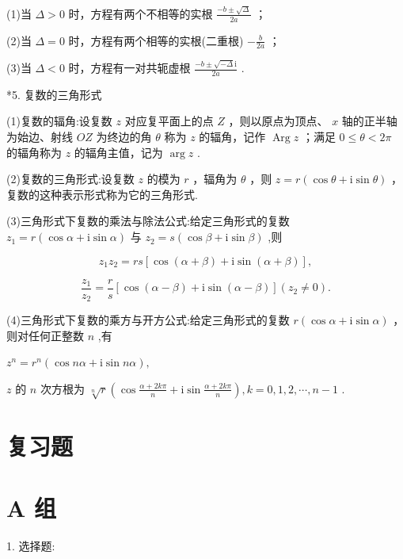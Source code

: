 \documentclass[10pt]{article}
\begin{document}
(1)当 \(\Delta  > 0\) 时，方程有两个不相等的实根 \(\frac{-b \pm  \sqrt{\Delta }}{2a}\) ；

(2)当 \(\Delta  = 0\) 时，方程有两个相等的实根(二重根) \(- \frac{b}{2a}\) ；

(3)当 \(\Delta  < 0\) 时，方程有一对共轭虚根 \(\frac{-b \pm  \sqrt{-\Delta }\mathrm{i}}{2a}\) .

*5. 复数的三角形式

(1)复数的辐角:设复数 \(z\) 对应复平面上的点 \(Z\) ，则以原点为顶点、 \(x\) 轴的正半轴为始边、射线 \({OZ}\) 为终边的角 \(\theta\) 称为 \(z\) 的辐角，记作 \(\operatorname{Arg}z\) ；满足 \(0 \leq  \theta  < {2\pi }\) 的辐角称为 \(z\) 的辐角主值，记为 \(\arg z\) .

(2)复数的三角形式:设复数 \(z\) 的模为 \(r\) ，辐角为 \(\theta\) ，则 \(z = r\left( {\cos \theta  + \mathrm{i}\sin \theta }\right)\) ，复数的这种表示形式称为它的三角形式.

(3)三角形式下复数的乘法与除法公式:给定三角形式的复数 \({z}_{1} = r\left( {\cos \alpha  + \mathrm{i}\sin \alpha }\right)\) 与 \({z}_{2} = s\left( {\cos \beta  + \mathrm{i}\sin \beta }\right)\) ,则

\[
{z}_{1}{z}_{2} = {rs}\left\lbrack  {\cos \left( {\alpha  + \beta }\right)  + \mathrm{i}\sin \left( {\alpha  + \beta }\right) }\right\rbrack  ,
\]

\[
\frac{{z}_{1}}{{z}_{2}} = \frac{r}{s}\left\lbrack  {\cos \left( {\alpha  - \beta }\right)  + \mathrm{i}\sin \left( {\alpha  - \beta }\right) }\right\rbrack  \left( {{z}_{2} \neq  0}\right) .
\]

(4)三角形式下复数的乘方与开方公式:给定三角形式的复数 \(r\left( {\cos \alpha  + \mathrm{i}\sin \alpha }\right)\) ，则对任何正整数 \(n\) ,有

\({z}^{n} = {r}^{n}\left( {\cos {n\alpha } + \mathrm{i}\sin {n\alpha }}\right) ,\)

\(z\) 的 \(n\) 次方根为 \(\sqrt[n]{r}\left( {\cos \frac{\alpha  + {2k\pi }}{n} + \mathrm{i}\sin \frac{\alpha  + {2k\pi }}{n}}\right) ,k = 0,1,2,\cdots ,n - 1\) .

\section*{复习题}

\section*{A 组}

1. 选择题:
\end{document}

